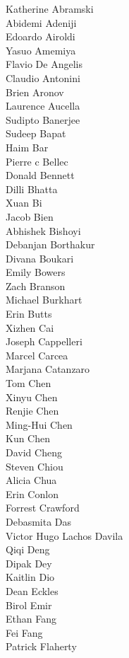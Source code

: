Katherine Abramski\\
Abidemi Adeniji\\
Edoardo Airoldi\\
Yasuo Amemiya\\
Flavio De Angelis\\
Claudio Antonini\\
Brien Aronov\\
Laurence Aucella\\
Sudipto Banerjee\\
Sudeep Bapat\\
Haim Bar\\
Pierre c Bellec\\
Donald Bennett\\
Dilli Bhatta\\
Xuan Bi\\
Jacob Bien\\
Abhishek Bishoyi\\
Debanjan Borthakur\\
Divana Boukari\\
Emily Bowers\\
Zach Branson\\
Michael Burkhart\\
Erin Butts\\
Xizhen Cai\\
Joseph Cappelleri\\
Marcel Carcea\\
Marjana Catanzaro\\
Tom Chen\\
Xinyu Chen\\
Renjie Chen\\
Ming-Hui  Chen\\
Kun Chen\\
David Cheng\\
Steven Chiou\\
Alicia Chua\\
Erin Conlon\\
Forrest Crawford\\
Debasmita Das\\
Victor Hugo Lachos Davila\\
Qiqi  Deng\\
Dipak Dey\\
Kaitlin Dio\\
Dean Eckles\\
Birol Emir\\
Ethan Fang\\
Fei Fang\\
Patrick Flaherty\\
